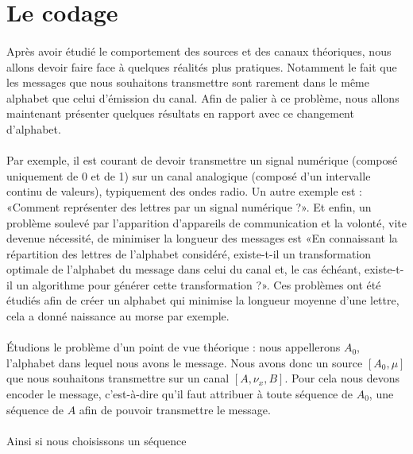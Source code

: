 \documentclass[a4paper,12pt]{article}
\begin{document}
\section{Le codage}
	\paragraph{}
	Après avoir étudié le comportement des sources et des canaux théoriques, nous
	allons devoir faire face à quelques réalités plus pratiques. Notamment le fait
	que les messages que nous souhaitons transmettre sont rarement dans le 
	même alphabet que celui d'émission du canal. Afin de palier à ce problème,
	nous allons maintenant présenter quelques résultats en rapport avec ce 
	changement d'alphabet. 
	
	\paragraph{}
	Par exemple, il est courant de devoir transmettre un signal numérique
	(composé uniquement de 0 et de 1) sur un canal analogique (composé 
	d'un intervalle continu de valeurs), typiquement des ondes radio.
	Un autre exemple est : «Comment représenter des 
	lettres par un signal numérique ?». Et enfin, un problème soulevé par 
	l'apparition d'appareils de communication et la volonté, vite devenue nécessité, 
	de minimiser la longueur des messages est
	«En connaissant la répartition des lettres de l'alphabet considéré,
	existe-t-il un transformation optimale de l'alphabet du message
	dans celui du canal et, le cas échéant, existe-t-il un algorithme pour générer cette transformation ?».
	Ces problèmes ont été étudiés afin de créer un alphabet qui minimise la longueur moyenne
	d'une lettre, cela a donné naissance au morse par exemple. 
	
	\paragraph{}
	Étudions le problème d'un point de vue théorique :
	nous appellerons $A_0$, l'alphabet dans lequel nous avons le message. Nous avons donc un source 
	$[A_0,\mu]$ que nous souhaitons transmettre sur un canal $[A,\nu_x,B]$. Pour cela nous devons encoder
	le message, c'est-à-dire qu'il faut attribuer à toute séquence de $A_0$, une séquence de $A$ afin de 
	pouvoir transmettre le message.

	\paragraph{}
	Ainsi si nous choisissons un séquence
\end{document}
